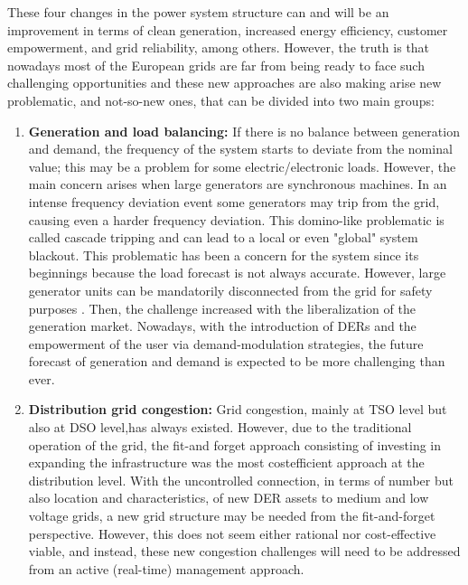 These four changes in the power system structure can and will be an improvement in terms of clean generation, increased energy efficiency, customer empowerment, and grid reliability, among others. However, the truth is that nowadays most of the European grids are far from being ready to face such challenging opportunities and these new approaches are also making arise new problematic, and not-so-new ones, that can be divided into two main groups: 
\begin{enumerate}
\item \textbf{Generation and load balancing:} If there is no balance between generation and demand, the frequency of the system starts to deviate from the nominal value; this may be a problem for some electric/electronic loads. However, the main concern arises when large generators are synchronous machines. In an intense frequency deviation event some generators may trip from the grid, causing even a harder frequency deviation. This domino-like problematic is called cascade tripping and can lead to a local or even "global" system blackout. This problematic has been a concern for the system since its beginnings because the load forecast is not always accurate. However, large generator units can be mandatorily disconnected from the grid for safety purposes \cite{Bollen2011}. Then, the challenge increased with the liberalization of the generation market. Nowadays, with the introduction of DERs and the empowerment of the user via demand-modulation strategies, the future forecast of generation and demand is expected to be more challenging than ever.

\item \textbf{Distribution grid congestion:} Grid congestion, mainly at TSO level but also at DSO level,has always existed. However, due to the traditional operation of the grid, the fit-and forget approach consisting of investing in expanding the infrastructure was the most costefficient approach at the distribution level. With the uncontrolled connection, in terms of number but also location and characteristics, of new DER assets to medium and low voltage grids, a new grid structure may be needed from the fit-and-forget perspective. However, this does not seem either rational nor cost-effective viable, and instead, these new congestion challenges will need to be addressed from an active (real-time) management approach.
\end{enumerate}


